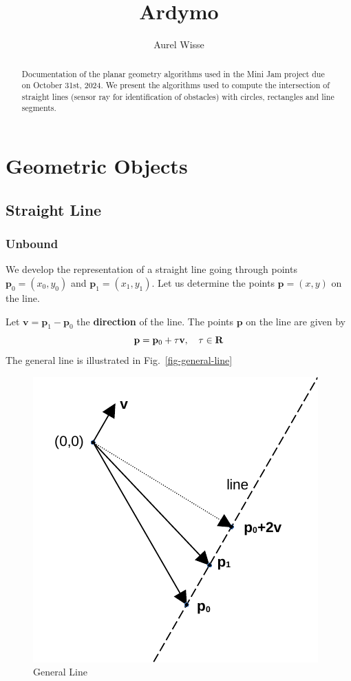 \documentclass[11pt]{article}
\newcommand{\pb}{\mathbf{p}}
\newcommand{\Rb}{\mathbf{R}}
\newcommand{\vb}{\mathbf{v}}
\newcommand{\figref}[1]{Fig.~\eqref{#1}}
\begin{document}
%
%
\title{Ardymo}
\author{Aurel Wisse}
\maketitle
%
%
\begin{abstract}
Documentation of the planar geometry algorithms used in the
Mini Jam project due on October 31st, 2024. We present the algorithms used to
compute the intersection of straight lines (sensor ray for identification
of obstacles) with circles, rectangles and line segments.
\end{abstract}
%
\pagebreak
\tableofcontents
\listoftables
\listoffigures
\pagebreak
%
\section{Geometric Objects}
\label{sec-geometric-objects}
\subsection{Straight Line}
\label{sec-straight-line}

\subsubsection{Unbound}
\label{sec-line-unbound}
We develop the representation of a straight line going through
points $\pb_0=(x_0, y_0)$ and $\pb_1=(x_1, y_1)$.
Let us determine the points $\pb=(x, y)$ on the line.

Let $\vb=\pb_1-\pb_0$ the {\bf direction} of the line. The points $\pb$ on the
line are given by
\begin{equation}
    \pb=\pb_0 + \tau \vb,\quad \tau\in\Rb \label{eq-line-general} \\
\end{equation}
The general line is illustrated in \figref{fig-general-line}
\begin{figure}
    \centering
    \includegraphics{odg/general-line.pdf}
    \caption{General Line}\label{fig-general-line}
\end{figure}
\end{document}
